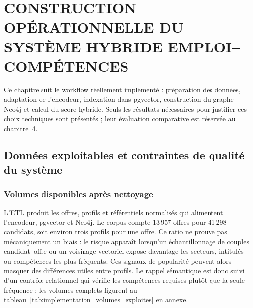 \chapter[CONSTRUCTION DU SYSTÈME HYBRIDE EMPLOI--COMPÉTENCES]{CONSTRUCTION OPÉRATIONNELLE DU SYSTÈME HYBRIDE EMPLOI--COMPÉTENCES}
Ce chapitre suit le workflow réellement implémenté : préparation des données, adaptation de l'encodeur, indexation dans pgvector, construction du graphe Neo4j et calcul du score hybride. Seuls les résultats nécessaires pour justifier ces choix techniques sont présentés ; leur évaluation comparative est réservée au chapitre~4.

\section{Données exploitables et contraintes de qualité du système}
\subsection{Volumes disponibles après nettoyage}

L'ETL produit les offres, profils et référentiels normalisés qui alimentent l'encodeur, pgvector et Neo4j. Le corpus compte 13\,957 offres pour 41\,298 candidats, soit environ trois profils pour une offre. Ce ratio ne prouve pas mécaniquement un biais : le risque apparaît lorsqu'un échantillonnage de couples candidat--offre ou un voisinage vectoriel expose davantage les secteurs, intitulés ou compétences les plus fréquents. Ces signaux de popularité peuvent alors masquer des différences utiles entre profils. Le rappel sémantique est donc suivi d'un contrôle relationnel qui vérifie les compétences requises plutôt que la seule fréquence ; les volumes complets figurent au tableau~\ref{tab:implementation_volumes_exploites} en annexe.

